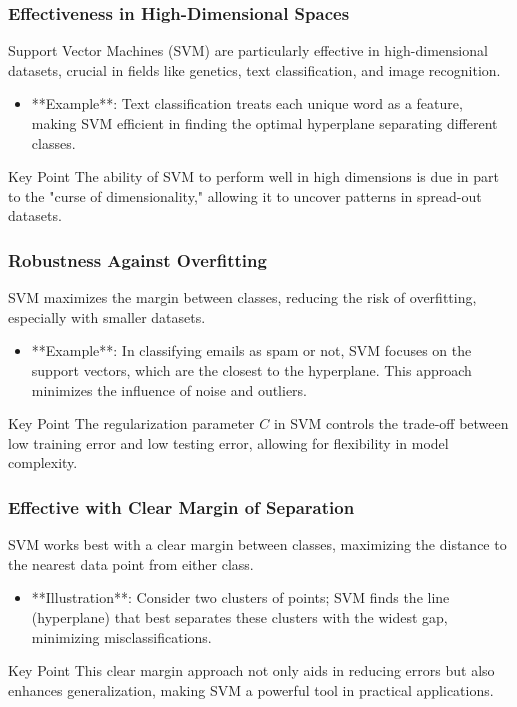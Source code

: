 \documentclass[aspectratio=169]{beamer}
\begin{document}
\begin{frame}[fragile]
    \frametitle{Effectiveness in High-Dimensional Spaces}
    Support Vector Machines (SVM) are particularly effective in high-dimensional datasets, crucial in fields like genetics, text classification, and image recognition.
    
    \begin{itemize}
        \item **Example**: Text classification treats each unique word as a feature, making SVM efficient in finding the optimal hyperplane separating different classes.
    \end{itemize}
    
    \begin{block}{Key Point}
        The ability of SVM to perform well in high dimensions is due in part to the "curse of dimensionality," allowing it to uncover patterns in spread-out datasets.
    \end{block}
\end{frame}

\begin{frame}[fragile]
    \frametitle{Robustness Against Overfitting}
    SVM maximizes the margin between classes, reducing the risk of overfitting, especially with smaller datasets.
    
    \begin{itemize}
        \item **Example**: In classifying emails as spam or not, SVM focuses on the support vectors, which are the closest to the hyperplane. This approach minimizes the influence of noise and outliers.
    \end{itemize}
    
    \begin{block}{Key Point}
        The regularization parameter \( C \) in SVM controls the trade-off between low training error and low testing error, allowing for flexibility in model complexity.
    \end{block}
\end{frame}

\begin{frame}[fragile]
    \frametitle{Effective with Clear Margin of Separation}
    SVM works best with a clear margin between classes, maximizing the distance to the nearest data point from either class.

    \begin{itemize}
        \item **Illustration**: Consider two clusters of points; SVM finds the line (hyperplane) that best separates these clusters with the widest gap, minimizing misclassifications.
    \end{itemize}
    
    \begin{block}{Key Point}
        This clear margin approach not only aids in reducing errors but also enhances generalization, making SVM a powerful tool in practical applications.
    \end{block}
\end{frame}
\end{document}
